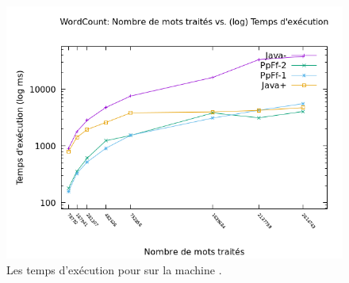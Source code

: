 %
% 


\begin{figure}[H]
\centering
     \includegraphics[width=1.0\textwidth]{Figures/graphe_temps_Java_WordCount.png}
      \caption{Les temps d'ex\'ecution pour  sur la machine .}
       \label{GrapheTempsWordCountJava.fig}
\end{figure}

